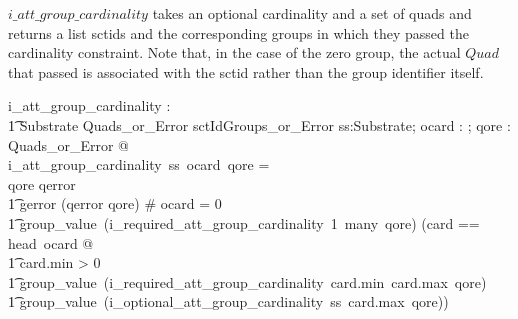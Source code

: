 \documentclass{article}
\begin{document}
$i\_att\_group\_cardinality$ takes an optional cardinality and a set of quads and returns a list sctids and the corresponding groups in which they passed the cardinality constraint.  Note that, in the case
of the zero group, the actual $Quad$ that passed is associated with the sctid rather than the group identifier itself.

\begin{axdef}
   i\_att\_group\_cardinality : \\
\t1 Substrate \fun \optional[cardinality] \fun Quads\_or\_Error \fun sctIdGroups\_or\_Error
\where
   \forall ss:Substrate; ocard : \optional[cardinality]; qore : Quads\_or\_Error @ \\
   i\_att\_group\_cardinality~ss~ocard~qore = \\
\IF qore \in \ran qerror \THEN \\
\t1 gerror (qerror \inv qore) 
\also
\ELSE \IF \# ocard = 0 \THEN \\
\t1 group\_value~(i\_required\_att\_group\_cardinality~1~many~qore)
\also
\ELSE (\LET card == head~ocard @ \\
\t1 \IF card.min > 0 \THEN \\
\t1 group\_value~(i\_required\_att\_group\_cardinality~card.min~card.max~qore)
\also
\ELSE \\
\t1 group\_value~(i\_optional\_att\_group\_cardinality~ss~card.max~qore))
\end{axdef}
\end{document}
